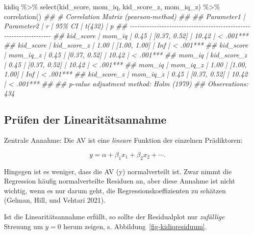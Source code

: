 \documentclass[
  a4paper,
  DIV=11]{scrreprt}
\newenvironment{Shaded}{\begin{snugshade}}{\end{snugshade}}
\newcommand{\DocumentationTok}[1]{\textcolor[rgb]{0.37,0.37,0.37}{\textit{#1}}}
\newcommand{\FunctionTok}[1]{\textcolor[rgb]{0.28,0.35,0.67}{#1}}
\newcommand{\NormalTok}[1]{\textcolor[rgb]{0.00,0.23,0.31}{#1}}
\newcommand{\SpecialCharTok}[1]{\textcolor[rgb]{0.37,0.37,0.37}{#1}}
\theoremstyle{definition}
\theoremstyle{remark}
\begin{document}
\begin{Shaded}
\begin{Highlighting}[]
\NormalTok{kidiq }\SpecialCharTok{\%\textgreater{}\%} 
  \FunctionTok{select}\NormalTok{(kid\_score, mom\_iq, kid\_score\_z, mom\_iq\_z) }\SpecialCharTok{\%\textgreater{}\%} 
  \FunctionTok{correlation}\NormalTok{()}
\DocumentationTok{\#\# \# Correlation Matrix (pearson{-}method)}
\DocumentationTok{\#\# }
\DocumentationTok{\#\# Parameter1  |  Parameter2 |    r |       95\% CI | t(432) |         p}
\DocumentationTok{\#\# {-}{-}{-}{-}{-}{-}{-}{-}{-}{-}{-}{-}{-}{-}{-}{-}{-}{-}{-}{-}{-}{-}{-}{-}{-}{-}{-}{-}{-}{-}{-}{-}{-}{-}{-}{-}{-}{-}{-}{-}{-}{-}{-}{-}{-}{-}{-}{-}{-}{-}{-}{-}{-}{-}{-}{-}{-}{-}{-}{-}{-}{-}{-}{-}{-}{-}{-}{-}}
\DocumentationTok{\#\# kid\_score   |      mom\_iq | 0.45 | [0.37, 0.52] |  10.42 | \textless{} .001***}
\DocumentationTok{\#\# kid\_score   | kid\_score\_z | 1.00 | [1.00, 1.00] |    Inf | \textless{} .001***}
\DocumentationTok{\#\# kid\_score   |    mom\_iq\_z | 0.45 | [0.37, 0.52] |  10.42 | \textless{} .001***}
\DocumentationTok{\#\# mom\_iq      | kid\_score\_z | 0.45 | [0.37, 0.52] |  10.42 | \textless{} .001***}
\DocumentationTok{\#\# mom\_iq      |    mom\_iq\_z | 1.00 | [1.00, 1.00] |    Inf | \textless{} .001***}
\DocumentationTok{\#\# kid\_score\_z |    mom\_iq\_z | 0.45 | [0.37, 0.52] |  10.42 | \textless{} .001***}
\DocumentationTok{\#\# }
\DocumentationTok{\#\# p{-}value adjustment method: Holm (1979)}
\DocumentationTok{\#\# Observations: 434}
\end{Highlighting}
\end{Shaded}

\hypertarget{pruxfcfen-der-linearituxe4tsannahme}{%
\subsection{Prüfen der
Linearitätsannahme}\label{pruxfcfen-der-linearituxe4tsannahme}}

Zentrale Annahme: Die AV ist eine \emph{lineare} Funktion der einzelnen
Prädiktoren:

\[y= \alpha + \beta_1x_1 + \beta_2 x_2 + \cdots .\]

Hingegen ist es weniger, dass die AV (y) normalverteilt ist. Zwar nimmt
die Regression häufig normalverteilte Residuen an, aber diese Annahme
ist nicht wichtig, wenn es nur darum geht, die Regressionskoeffizienten
zu schätzen (Gelman, Hill, und Vehtari 2021).

Ist die Linearitätsannahme erfüllt, so sollte der Residualplot nur
\emph{zufällige} Streuung um \(y=0\) herum zeigen, s.
Abbildung~\ref{fig-kidiqresiduum}.
\end{document}
